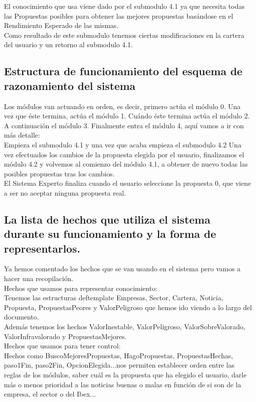 \documentclass[12pt]{article}
\begin{document}
El conocimiento que usa viene dado por el submodulo 4.1 ya que necesita todas las Propuestas posibles para obtener las mejores propuestas basándose en el Rendimiento Esperado de las mismas. \\

Como resultado de este submodulo tenemos ciertas modificaciones en la cartera del usuario y un retorno al submodulo 4.1.



\subsection{Estructura de funcionamiento del esquema de razonamiento del sistema}
Los módulos van actuando en orden, es decir, primero actúa el módulo 0. Una vez que éste termina, actúa el módulo 1. Cuándo éste termina actúa el módulo 2. A continuación el módulo 3. Finalmente entra el módulo 4, aquí vamos a ir con más detalle: \\

Empieza el submodulo 4.1 y una vez que acaba empieza el submodulo 4.2 Una vez efectuados los cambios de la propuesta elegida por el usuario, finalizamos el módulo 4.2 y volvemos al comienzo del módulo 4.1, a obtener de nuevo todas las posibles propuestas tras los cambios. \\

El Sistema Experto finaliza cuando el usuario seleccione la propuesta 0, que viene a ser no aceptar ninguna propuesta real. 

\newpage
\subsection{La lista de hechos que utiliza el sistema durante su funcionamiento y la forma de representarlos.}
Ya hemos comentado los hechos que se van usando en el sistema pero vamos a hacer una recopilación. \\

Hechos que usamos para representar conocimiento:\\
Tenemos las estructuras deftemplate Empresas, Sector, Cartera, Noticia, Propuesta, PropuestasPeores y ValorPeligroso que hemos ido viendo a lo largo del documento.\\
Además tenemos los hechos ValorInestable, ValorPeligroso, ValorSobreValorado, ValorInfravalorado y PropuestasMejores.\\

Hechos que usamos para tener control:\\
Hechos como BuscoMejoresPropuestas, HagoPropuestas, PropuestasHechas, paso1Fin, paso2Fin, OpcionElegida...nos permiten establecer orden entre las reglas de los módulos, saber cuál es la propuesta que ha elegido el usuario, darle más o menos prioridad a las noticias buenas o malas en función de si son de la empresa, el sector o del Ibex...\\
\end{document}
